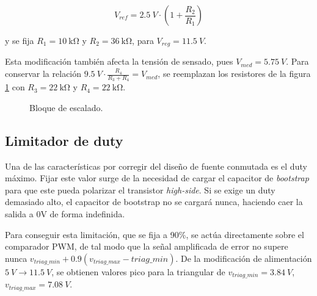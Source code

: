 \documentclass[]{article}
\begin{document}
\begin{equation}
	V_{ref} = \SI{2.5}{V} \cdot \left( 1 + \frac{R_2}{R_1}  \right) \label{eq:reg}
\end{equation}

y se fija $R_1 = \SI{10}{\kilo \ohm}$ y $R_2 = \SI{36}{\kilo \ohm}$, para $V_{reg} = \SI{11.5}{V}$.

Esta modificación también afecta la tensión de sensado, pues $V_{med} = \SI{5.75}{V}$. Para conservar la relación $\SI{9.5}{V} \cdot \frac{R_4}{R_3 + R_4} = V_{med}$, se reemplazan los resistores de la figura \ref{fig:rsense} con $R_3 = \SI{22}{\kilo\ohm}$ y $R_4 = \SI{22}{\kilo\ohm}$.

	\begin{figure}[H]
	\centering
{}
	\caption{Bloque de escalado.}
	\label{fig:rsense}
\end{figure}

\subsection{Limitador de duty}
	
	Una de las características por corregir del diseño de fuente conmutada es el duty máximo. Fijar este valor surge de la necesidad de cargar el capacitor de \textit{bootstrap} para que este pueda polarizar el transistor \textit{high-side}. Si se exige un duty demasiado alto, el capacitor de bootstrap no se cargará nunca, haciendo caer la salida a 0V de forma indefinida.
	
	Para conseguir esta limitación, que se fija a 90\%, se actúa directamente sobre el comparador PWM, de tal modo que la señal amplificada de error no supere nunca $v_{triag\_min} + 0.9 (v_{triag\_max} - {triag\_min})$. De la modificación de alimentación $\SI{5}{V} \to \SI{11.5}{V}$, se obtienen valores pico para la triangular de $v_{triag\_min} = \SI{3.84}{V}$, $v_{triag\_max} = \SI{7.08}{V}$.
	
\end{document}
